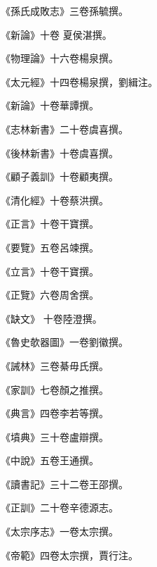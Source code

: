 \begin{pinyinscope}
 《孫氏成敗志》三卷孫毓撰。



 《新論》十卷
 夏侯湛撰。



 《物理論》十六卷楊泉撰。



 《太元經》十四卷楊泉撰，劉緝注。



 《新論》十卷華譚撰。



 《志林新書》二十卷虞喜撰。



 《後林新書》十卷虞喜撰。



 《顧子義訓》十卷顧夷撰。



 《清化經》十卷蔡洪撰。



 《正言》十卷干寶撰。



 《要覽》五卷呂竦撰。



 《立言》十卷干寶撰。



 《正覽》六卷周舍撰。



 《缺文》
 十卷陸澄撰。



 《魯史欹器圖》一卷劉徽撰。



 《誡林》三卷綦毋氏撰。



 《家訓》七卷顏之推撰。



 《典言》四卷李若等撰。



 《墳典》三十卷盧辯撰。



 《中說》五卷王通撰。



 《讀書記》三十二卷王邵撰。



 《正訓》二十卷辛德源志。



 《太宗序志》一卷太宗撰。



 《帝範》四卷太宗撰，賈行注。




\end{pinyinscope}
